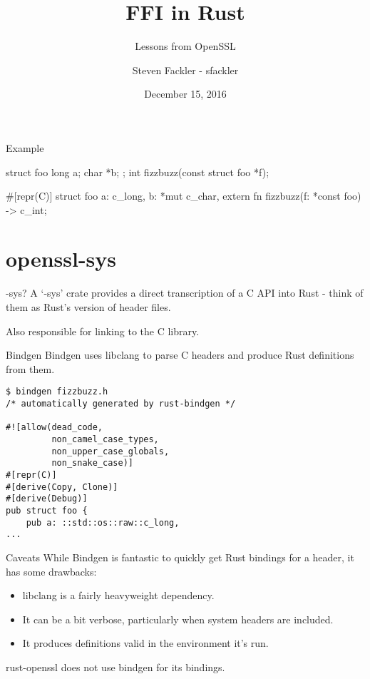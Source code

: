 \documentclass{beamer}
\title{FFI in Rust}
\subtitle{Lessons from OpenSSL}
\author[sfackler]{Steven Fackler - sfackler}
\date{December 15, 2016}
\begin{document}

\frame{\titlepage}

\begin{frame}[fragile]{Example}
    \begin{ccode}
struct foo {
    long a;
    char *b;
};
int fizzbuzz(const struct foo *f);
    \end{ccode}
    \pause
    \vspace{10pt}
    \begin{rustcode}
#[repr(C)]
struct foo {
    a: c_long,
    b: *mut c_char,
}
extern {
    fn fizzbuzz(f: *const foo) -> c_int;
}
    \end{rustcode}
\end{frame}

\section{openssl-sys}

\begin{frame}{-sys?}
    A `-sys' crate provides a direct transcription of a C API into Rust - think
    of them as Rust's version of header files.

    Also responsible for linking to the C library.
\end{frame}

\begin{frame}[fragile]{Bindgen}
    Bindgen uses libclang to parse C headers and produce Rust definitions from
    them.

    \begin{verbatim}
$ bindgen fizzbuzz.h
/* automatically generated by rust-bindgen */

#![allow(dead_code,
         non_camel_case_types,
         non_upper_case_globals,
         non_snake_case)]
#[repr(C)]
#[derive(Copy, Clone)]
#[derive(Debug)]
pub struct foo {
    pub a: ::std::os::raw::c_long,
...
    \end{verbatim}
\end{frame}

\begin{frame}{Caveats}
    While Bindgen is fantastic to quickly get Rust bindings for a header, it
    has some drawbacks:

    \begin{itemize}
        \item libclang is a fairly heavyweight dependency.
        \item It can be a bit verbose, particularly when system headers are
            included.
        \item It produces definitions valid in the environment it's run.
    \end{itemize}

    rust-openssl does not use bindgen for its bindings.
\end{frame}
\end{document}
